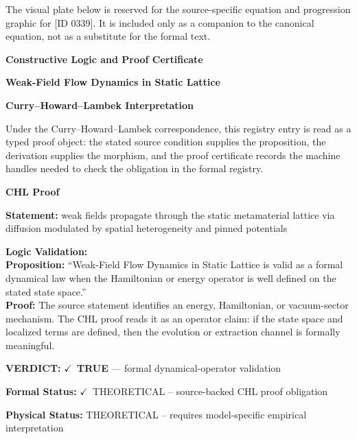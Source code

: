 \begingroup\footnotesize\sloppy
The visual plate below is reserved for the source-specific equation and progression graphic for [ID 0339]. It is included only as a companion to the canonical equation, not as a substitute for the formal text.
\par\endgroup
\ifTZPDarkEdition
{}
\fi

\clearpage
\begingroup\tzpsupportsetup
\noindent\textbf{\fontsize{10.8pt}{12.8pt}\selectfont [ID 0339] Constructive Logic and Proof Certificate}\par
\noindent\textbf{\fontsize{10pt}{12pt}\selectfont Weak-Field Flow Dynamics in Static Lattice}\par
\vspace{0.45em}
\begingroup
\footnotesize
\setlength{\parskip}{0.22em}
\setlength{\parindent}{0pt}
\noindent\textbf{Curry--Howard--Lambek Interpretation}\par
Under the Curry--Howard--Lambek correspondence, this registry entry is read as a typed proof
object: the stated source condition supplies the proposition, the derivation supplies the
morphism, and the proof certificate records the machine handles needed to check the obligation
in the formal registry.

\vspace{0.45em}
\noindent\textbf{CHL Proof}\par
\textbf{Statement:} weak fields propagate through the static metamaterial lattice via diffusion modulated by
spatial heterogeneity and pinned potentials

\textbf{Logic Validation:}\\
\textbf{Proposition:} ``Weak-Field Flow Dynamics in Static Lattice is valid as a formal dynamical law when the
Hamiltonian or energy operator is well defined on the stated state space.''\\
\textbf{Proof:} The source statement identifies an energy, Hamiltonian, or vacuum-sector mechanism. The
CHL proof reads it as an operator claim: if the state space and localized terms are
defined, then the evolution or extraction channel is formally meaningful.

\textbf{VERDICT:} \ensuremath{\checkmark}\ \textbf{TRUE} --- formal dynamical-operator validation

\textbf{Formal Status:} \ensuremath{\checkmark}\ THEORETICAL -- source-backed CHL proof obligation

\textbf{Physical Status:} THEORETICAL -- requires model-specific empirical interpretation
\par\vspace{0.45em}
\par
\ifTZPDarkEdition
{}
\fi
\endgroup
\endgroup
